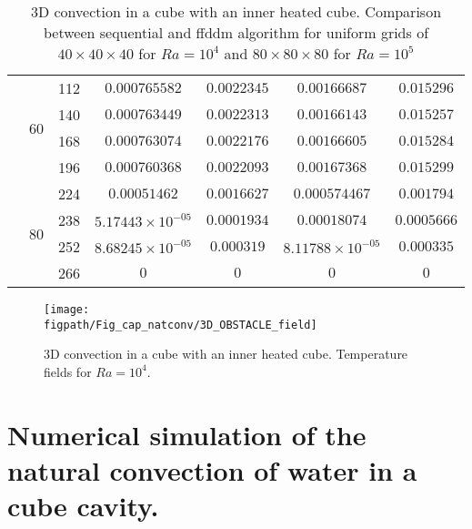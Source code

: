 \begin{table} [!ht]
\begin{center}
\begin{tabular}{|*{7}{c|}}
			 & \multirow{4}{*}{60} & 112 & $0.000765582$ & $0.0022345$ & $ 0.00166687 $ & $0.015296$ \\%
			\cline{3-7}
			& & 140 & $0.000763449$ & $0.0022313$ & $ 0.00166143 $ & $0.015257$ \\ \cline{3-7} %
			& & 168 & $0.000763074$ & $0.0022176$ & $ 0.00166605 $ & $0.015284$  \\ \cline{3-7} %
			& & 196 & $0.000760368$ & $0.0022093$ & $ 0.00167368 $ & $0.015299$ \\ \cline{2-7} 
			 & \multirow{4}{*}{80} & 224 & $0.00051462$ & $0.0016627$ & $ 0.000574467 $ & $0.001794$ \\%
			\cline{3-7}
			& & 238 & $5.17443 \times 10^{-05}$ & $0.0001934$ & $ 0.00018074 $ & $0.0005666$ \\ \cline{3-7} %
			& & 252 & $8.68245 \times 10^{-05}$ & $0.000319$ & $ 8.11788 \times 10^{-05} $ & $0.000335$  \\ \cline{3-7} %
			& & 266 & $0$ & $0$ & $ 0 $ & $0$ \\ \hline 

		\end{tabular}
	\end{center}
	\caption {3D convection in a cube with an inner heated cube. Comparison between sequential and ffddm algorithm for uniform grids of $40 \times 40 \times 40$ for $Ra = 10^4$ and $80 \times 80 \times 80$ for $Ra = 10^5$}
	\label{tab-T2}
\end{table}






\begin{figure} [!ht]
\begin{center}
\begin{minipage}{\linewidth}
 {\texttt{[image: \\figpath/Fig\_cap\_natconv/3D\_OBSTACLE\_field]}}
\end{minipage}
\end{center}
\caption{3D convection in a cube with an inner heated cube. Temperature fields for $Ra = 10^4$.}
\label{fig-obstacle-Ra1e4} 
\end{figure}

\clearpage
\newpage
\section{Numerical simulation of the natural convection of water in a cube cavity.} \label{sec-3D-water-convec}
